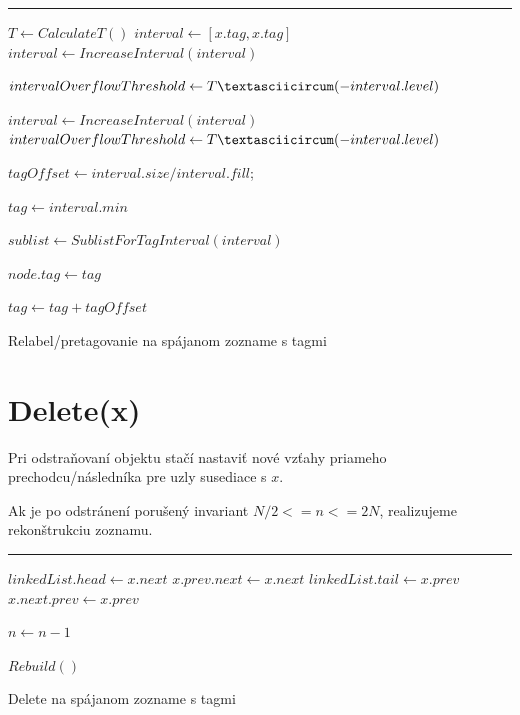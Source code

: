 \documentclass[
  digital,     %
  oneside,     %
  nosansbold,  %
  nocolorbold, %
  lof,         %
  lot,         %
]{fithesis4}
\begin{document}
\begin{algorithm}
\hrule\vspace{0.2em}
$T \leftarrow CalculateT()$\;
$interval \leftarrow [x.tag, x.tag]$\;
$interval \leftarrow IncreaseInterval(interval)$\;

$intervalOverflowThreshold \leftarrow T\textasciicircum(- interval.level)$

{
    
    $interval \leftarrow IncreaseInterval(interval)$\;
    $intervalOverflowThreshold \leftarrow T\textasciicircum(- interval.level)$\;
}


$tagOffset \leftarrow interval.size / interval.fill$; 

$tag \leftarrow interval.min$\;

$sublist \leftarrow SublistForTagInterval(interval)$\;

{
    $node.tag \leftarrow tag$\;
    
    $tag \leftarrow tag + tagOffset$\;
}
\caption{Relabel/pretagovanie na spájanom zozname s tagmi}
\end{algorithm}

\section{Delete(x)}
Pri odstraňovaní objektu stačí nastaviť nové vzťahy priameho prechodcu/následníka pre uzly susediace s $x$.

Ak je po odstránení porušený invariant $N/2 <= n <= 2N$, realizujeme rekonštrukciu zoznamu.

\begin{algorithm}
\hrule\vspace{0.2em}
{
    $linkedList.head \leftarrow x.next$\;
}
\Else
{
    $x.prev.next \leftarrow x.next$\;
}
{
    $linkedList.tail \leftarrow x.prev$\;
}
\Else
{
    $x.next.prev \leftarrow x.prev$\;
}

$n \leftarrow n - 1$\;

{
    $Rebuild()$\;
}
\caption{Delete na spájanom zozname s tagmi}
\end{algorithm}
\end{document}
